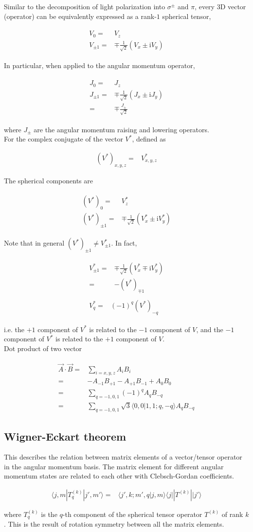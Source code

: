 \documentclass[10pt,fleqn]{article}
\newcommand{\ui}{\mathrm{i}}
\newcommand{\eqar}[1]
{
  \begin{align}
    #1
  \end{align}
}
\newcommand{\paren}[1]{{\left({#1}\right)}}
\begin{document}
Similar to the decomposition of light polarization into $\sigma^\pm$ and $\pi$,
every 3D vector (operator) can be equivalently expressed
as a rank-$1$ spherical tensor,
\eqar{
  \begin{split}
    V_0=&V_z\\
    V_{\pm1}=&\mp\frac{1}{\sqrt2}\paren{V_x\pm\ui V_y}
  \end{split}
}

In particular, when applied to the angular momentum operator,
\eqar{
  \begin{split}
    J_0=&J_z\\
    J_{\pm1}=&\mp\frac{1}{\sqrt2}\paren{J_x\pm\ui J_y}\\
    =&\mp\frac{J_{\pm}}{\sqrt2}
  \end{split}
}
where $J_{\pm}$ are the angular momentum raising and lowering operators.\\

For the complex conjugate of the vector $V^*$, defined as
\eqar{
  (V^*)_{x,y,z}=&V^*_{x,y,z}
}
The spherical components are
\eqar{
  \begin{split}
    (V^*)_0=&V^*_z\\
    (V^*)_{\pm1}=&\mp\frac{1}{\sqrt2}\paren{V^*_x\pm\ui V^*_y}
  \end{split}\label{eq:spherical:conj}
}
Note that in general $(V^*)_{\pm1}\neq V^*_{\pm1}$. In fact,
\eqar{
  \begin{split}
    V^*_{\pm1}=&\mp\frac{1}{\sqrt2}\paren{V^*_x\mp\ui V^*_y}\\
    =&-(V^*)_{\mp1}
  \end{split}\\
  \begin{split}
    V^*_q=&(-1)^q(V^*)_{-q}
  \end{split}
}
i.e. the $+1$ component of $V^*$ is related to the $-1$ component of $V$,
and the $-1$ component of $V^*$ is related to the $+1$ component of $V$.\\

Dot product of two vector
\eqar{
  \begin{split}
    \vec A\cdot\vec B=&\sum_{i=x,y,z}A_iB_i\\
    =&-A_{-1}B_{+1}-A_{+1}B_{-1}+A_0B_0\\
    =&\sum_{q=-1,0,1}(-1)^qA_{q}B_{-q}\\
    =&\sum_{q=-1,0,1}\sqrt{3}\langle 0,0|1,1;q,-q\rangle A_{q}B_{-q}
  \end{split}
}

\subsection{Wigner-Eckart theorem}
This describes the relation between matrix elements of a vector/tensor operator
in the angular momentum basis.
The matrix element for different angular momentum states are related to each other
with Clebsch-Gordan coefficients.
\eqar{
  \langle j,m|T_q^{(k)}|j',m' \rangle=&\langle j',k;m',q|j,m\rangle\langle j||T^{(k)}||j'\rangle
}
where $T_q^{(k)}$ is the $q$-th component of
the spherical tensor operator $T^{(k)}$ of rank $k$.
This is the result of rotation symmetry between all the matrix elements.\\
\end{document}
